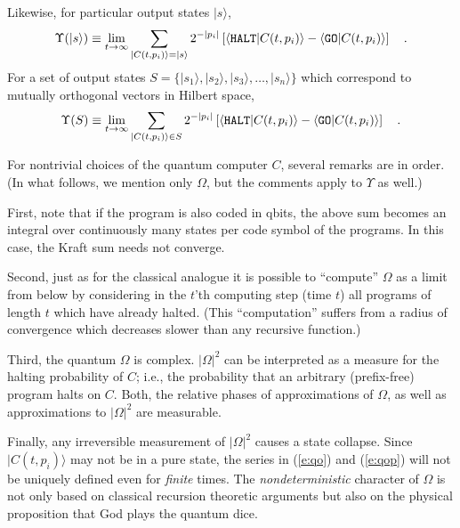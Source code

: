 Likewise, for particular output states
$\vert s\rangle
$,
 \begin{equation}
  \Upsilon ( \vert s\rangle )  \equiv \lim_{t\rightarrow \infty}
\sum_{\vert C(t,p_i)\rangle =\vert s\rangle }
2^{-\vert p_i\vert
}
\left[
\langle  {\tt HALT} \vert  C(t,p_i) \rangle
-\langle  {\tt GO} \vert  C(t,p_i) \rangle \right]
\quad .
\label{e:qop}
 \end{equation}
For a set of output states
 $S=\{
\vert s_1\rangle ,
\vert s_2\rangle ,
\vert s_3\rangle ,
\ldots
,\vert s_n\rangle\}$
 which correspond to mutually orthogonal
vectors in Hilbert space,
 \begin{equation}
  \Upsilon ( S )  \equiv \lim_{t\rightarrow \infty}
\sum_{\vert C(t,p_i)\rangle \in S }
2^{-\vert p_i\vert
}
\left[ \langle  {\tt HALT} \vert  C(t,p_i) \rangle
-\langle  {\tt GO} \vert  C(t,p_i) \rangle \right]
\quad .
\label{e:qop1}
 \end{equation}

For nontrivial choices of the quantum computer $C$,
several remarks are in order.
(In what follows, we mention only $\Omega$, but the comments apply to
$\Upsilon$ as well.)

First, note that if the program is also
coded in qbits, the above sum becomes an
integral over continuously many states per code symbol of the programs.
In this case, the Kraft sum needs not converge.

Second, just as for the classical analogue it is possible to ``compute''
$\Omega $ as a limit from below
by considering
in the $t$'th computing step (time $t$) all programs of length $t$
which have already halted.
(This ``computation'' suffers
from a radius of convergence which decreases slower than any recursive
function.)

Third,
the quantum $\Omega$ is complex.
$\vert \Omega \vert^2$ can be interpreted as a measure for the halting
probability of
$C$; i.e., the probability that an arbitrary (prefix-free) program
halts on
$C$.
Both, the relative phases of approximations of $\Omega$, as well as
approximations to $\vert \Omega \vert^2$ are measurable.


Finally,
any irreversible measurement of $\vert \Omega \vert^2$
causes a state collapse.
Since $\vert  C(t,p_i)\rangle $ may not be in a
pure state, the  series in
 (\ref{e:qo}) and
 (\ref{e:qop})
will not be uniquely defined even for {\em finite} times.
The {\em nondeterministic} character of $\Omega$ is not only based
on classical recursion theoretic arguments \cite{chaitin} but
also on the physical proposition that  God plays the
quantum dice.



